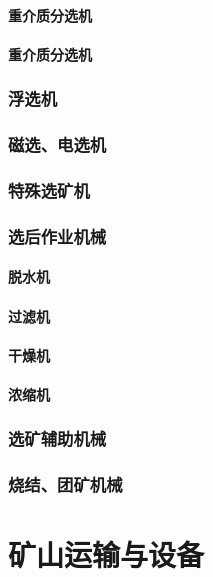 \documentclass[UTF8]{../../ApplicationUniverse}
\begin{document}
        \subsubsection{重介质分选机}
        \subsubsection{重介质分选机}
    \subsection{浮选机}
    \subsection{磁选、电选机}
    \subsection{特殊选矿机}
    \subsection{选后作业机械}
        \subsubsection{脱水机}
        \subsubsection{过滤机}
        \subsubsection{干燥机}
        \subsubsection{浓缩机}
    \subsection{选矿辅助机械}
    \subsection{烧结、团矿机械}










\chapter{矿山运输与设备}
\end{document}
